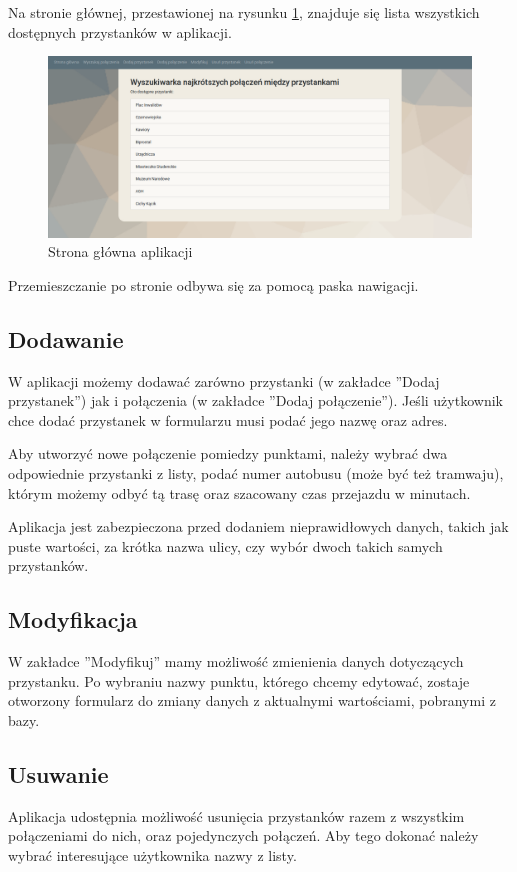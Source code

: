 \documentclass[12pt]{article}
\begin{document}
Na stronie głównej, przestawionej na rysunku \ref{fig:rys1}, znajduje się lista wszystkich dostępnych przystanków w aplikacji.

\begin{figure}[h]
\begin{center}
\includegraphics[width=14cm]{strona.png} 
\caption{Strona główna aplikacji} \label{fig:rys1}
\end{center}
\end{figure}

Przemieszczanie po stronie odbywa się za pomocą paska nawigacji.

\subsection{Dodawanie}
W aplikacji możemy dodawać zarówno przystanki (w zakładce ''Dodaj przystanek'') jak i połączenia (w zakładce ''Dodaj połączenie''). Jeśli użytkownik chce dodać przystanek w formularzu musi podać jego nazwę oraz adres. 

Aby utworzyć nowe połączenie pomiedzy punktami, należy wybrać dwa odpowiednie przystanki z listy, podać numer autobusu (może być też tramwaju), którym możemy odbyć tą trasę oraz szacowany czas przejazdu w minutach.

Aplikacja jest zabezpieczona przed dodaniem nieprawidłowych danych, takich jak puste wartości, za krótka nazwa ulicy, czy wybór dwoch takich samych przystanków.

\subsection{Modyfikacja}
W zakładce ''Modyfikuj'' mamy możliwość zmienienia danych dotyczących przystanku. Po wybraniu nazwy punktu, którego chcemy edytować, zostaje otworzony formularz do zmiany danych z aktualnymi wartościami, pobranymi z bazy.

\subsection{Usuwanie}
Aplikacja udostępnia możliwość usunięcia przystanków razem z wszystkim połączeniami do nich, oraz pojedynczych połączeń. Aby tego dokonać należy wybrać interesujące użytkownika nazwy z listy.
\end{document}
